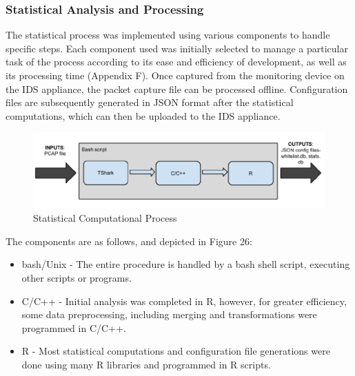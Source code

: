 \documentclass[11pt,a4paper]{article}
\begin{document}
\subsubsection{Statistical Analysis and
Processing}\label{statistical-analysis-and-processing}

The statistical process was implemented using various components to
handle specific steps. Each component used was initially selected to
manage a particular task of the process according to its ease and
efficiency of development, as well as its processing time (Appendix F).
Once captured from the monitoring device on the IDS appliance, the
packet capture file can be processed offline. Configuration files are
subsequently generated in JSON format after the statistical
computations, which can then be uploaded to the IDS appliance.

\begin{figure}[h]

{\centering \includegraphics{thesis_files/figure-latex/unnamed-chunk-38-1} 

}

\caption{Statistical Computational Process}\label{fig:unnamed-chunk-38}
\end{figure}

\newpage

The components are as follows, and depicted in Figure 26:

\begin{itemize}
\itemsep1pt\parskip0pt
\item
  bash/Unix - The entire procedure is handled by a bash shell script,
  executing other scripts or programs.
\item
  C/C++ - Initial analysis was completed in R, however, for greater
  efficiency, some data preprocessing, including merging and
  transformations were programmed in C/C++.
\item
  R - Most statistical computations and configuration file generations
  were done using many R libraries and programmed in R scripts.
\end{itemize}

\clearpage
\end{document}
